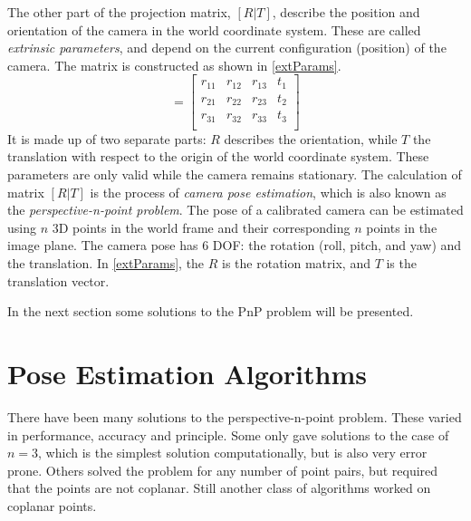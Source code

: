 The other part of the projection matrix, $[R | T]$, describe the position and orientation of the camera in the world coordinate system.
These are called \textit{extrinsic parameters}, and depend on the current configuration (position) of the camera.
The matrix is constructed as shown in \eqref{extParams}.
\begin{equation}
	[R | T] =
	\begin{bmatrix}
		r_{11} & r_{12} & r_{13} & t_1\\
		r_{21} & r_{22} & r_{23} & t_2\\
		r_{31} & r_{32} & r_{33} & t_3\\
	\end{bmatrix}
	\label{eq:extParams}
\end{equation}
It is made up of two separate parts: $R$ describes the orientation, while $T$ the translation with respect to the origin of the world coordinate system.
These parameters are only valid while the camera remains stationary.
The calculation of matrix $[R|T]$ is the process of \textit{camera pose estimation}, which is also known as the \textit{perspective-n-point problem}.
The pose of a calibrated camera can be estimated using $n$ 3D points in the world frame and their corresponding $n$ points in the image plane.
The camera pose has 6 DOF: the rotation (roll, pitch, and yaw) and the translation.
In \eqref{extParams}, the $R$ is the rotation matrix, and $T$ is the translation vector.

In the next section some solutions to the PnP problem will be presented.

\section{Pose Estimation Algorithms}

There have been many solutions to the perspective-n-point problem.
These varied in performance, accuracy and principle.
Some only gave solutions to the case of $n=3$, which is the simplest solution computationally, but is also very error prone. 
Others solved the problem for any number of point pairs, but required that the points are not coplanar.
Still another class of algorithms worked on coplanar points.


